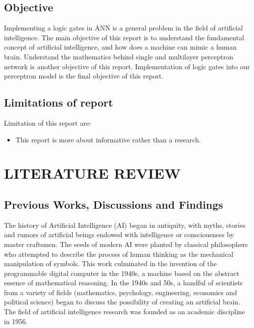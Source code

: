 \documentclass[a4paper,12pt]{report}
\begin{document}
\section{Objective}
Implementing a logic gates in ANN is a general problem in the field of artificial intelligence. The main objective of this report is to understand the fundamental concept of artificial intelligence, and how does a machine can mimic a human brain. Understand the mathematics behind single and multilayer perceptron network is another objective of this report. Implementation of logic gates into our perceptron model is the final objective of this report.


\section{Limitations of report}
Limitation of this report are:
\begin{itemize}
	\item This report is more about informative rather than a research.
\end{itemize}

\chapter{LITERATURE REVIEW}
\section{Previous Works, Discussions and Findings}
The history of Artificial Intelligence (AI) began in antiquity, with myths, stories and rumors of artificial beings endowed with intelligence or consciousness by master craftsmen. The seeds of modern AI were planted by classical philosophers who attempted to describe the process of human thinking as the mechanical manipulation of symbols. This work culminated in the invention of the programmable digital computer in the 1940s, a machine based on the abstract essence of mathematical reasoning. In the 1940s and 50s, a handful of scientists from a variety of fields (mathematics, psychology, engineering, economics and political science) began to discuss the possibility of creating an artificial brain. The field of artificial intelligence research was founded as an academic discipline in 1956.
\end{document}
